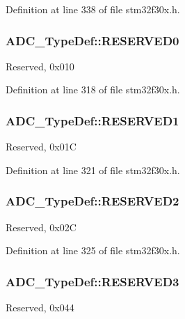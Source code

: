 Definition at line 338 of file stm32f30x.\-h.

\hypertarget{struct_a_d_c___type_def_af740868b36d8ec3898c3567f2cfaac63}{
\subsubsection[{R\-E\-S\-E\-R\-V\-E\-D0}]{ A\-D\-C\-\_\-\-Type\-Def\-::\-R\-E\-S\-E\-R\-V\-E\-D0}}\label{struct_a_d_c___type_def_af740868b36d8ec3898c3567f2cfaac63}
Reserved, 0x010 

Definition at line 318 of file stm32f30x.\-h.

\hypertarget{struct_a_d_c___type_def_a54d49ecc780f3fd305613ecf4f817f80}{
\subsubsection[{R\-E\-S\-E\-R\-V\-E\-D1}]{ A\-D\-C\-\_\-\-Type\-Def\-::\-R\-E\-S\-E\-R\-V\-E\-D1}}\label{struct_a_d_c___type_def_a54d49ecc780f3fd305613ecf4f817f80}
Reserved, 0x01\-C 

Definition at line 321 of file stm32f30x.\-h.

\hypertarget{struct_a_d_c___type_def_a30aca300e6a05f1afa16406770c0dd52}{
\subsubsection[{R\-E\-S\-E\-R\-V\-E\-D2}]{ A\-D\-C\-\_\-\-Type\-Def\-::\-R\-E\-S\-E\-R\-V\-E\-D2}}\label{struct_a_d_c___type_def_a30aca300e6a05f1afa16406770c0dd52}
Reserved, 0x02\-C 

Definition at line 325 of file stm32f30x.\-h.

\hypertarget{struct_a_d_c___type_def_ad4ffd02fea1594fdd917132e217e466a}{
\subsubsection[{R\-E\-S\-E\-R\-V\-E\-D3}]{ A\-D\-C\-\_\-\-Type\-Def\-::\-R\-E\-S\-E\-R\-V\-E\-D3}}\label{struct_a_d_c___type_def_ad4ffd02fea1594fdd917132e217e466a}
Reserved, 0x044 

